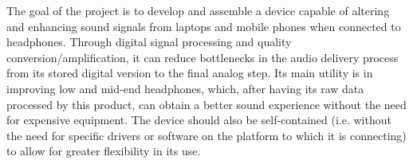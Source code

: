 
\begin{abstractutfpr}%
The goal of the project is to develop and assemble a device capable of altering and enhancing sound signals from laptops and mobile phones when connected to headphones. Through digital signal processing and quality conversion/amplification, it can reduce bottlenecks in the audio delivery process from its stored digital version to the final analog step. Its main utility is in improving low and mid-end headphones, which, after having its raw data processed by this product, can obtain a better sound experience without the need for expensive equipment. The device should also be self-contained (i.e. without the need for specific drivers or software on the platform to which it is connecting) to allow for greater flexibility in its use.
\end{abstractutfpr}

